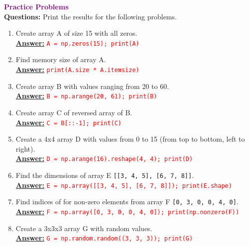 \documentclass{book}
\begin{document}
\newpage
\textbf{\textcolor{purple}{\Large{Practice Problems}}}\\
\textbf{Questions:} Print the results for the following problems.\\
\begin{enumerate}
    \item Create array A of size 15 with all zeros.\\
    \underline{\textbf{Answer:}} \textcolor{red}{\texttt{A = np.zeros(15); print(A)}}
    \vspace{1.5mm}
    \item Find memory size of array A.\\
    \underline{\textbf{Answer:}} \textcolor{red}{\texttt{print(A.size * A.itemsize)}}
    \vspace{1.5mm}
    \item Create array B with values ranging from 20 to 60.\\
    \underline{\textbf{Answer:}} \textcolor{red}{\texttt{B = np.arange(20, 61); print(B)}}
    \vspace{1.5mm}
    \item Create array C of reversed array of B.\\
    \underline{\textbf{Answer:}} \textcolor{red}{\texttt{C = B[::-1]; print(C)}}
    \vspace{1.5mm}
    \item Create a 4x4 array D with values from 0 to 15 (from top to bottom, left to right).\\
    \underline{\textbf{Answer:}} \textcolor{red}{\texttt{D = np.arange(16).reshape(4, 4); print(D)}}
    \vspace{1.5mm}
    \item Find the dimensions of array E \texttt{[[3, 4, 5], [6, 7, 8]]}.\\
    \underline{\textbf{Answer:}} \textcolor{red}{\texttt{E = np.array([[3, 4, 5], [6, 7, 8]]); print(E.shape)}}
    \vspace{1.5mm}
    \item Find indices of for non-zero elements from array F \texttt{[0, 3, 0, 0, 4, 0]}.\\
    \underline{\textbf{Answer:}} \textcolor{red}{\texttt{F = np.array([0, 3, 0, 0, 4, 0]); print(np.nonzero(F))}}
    \vspace{1.5mm}
    \item Create a 3x3x3 array G with random values.\\
    \underline{\textbf{Answer:}} \textcolor{red}{\texttt{G = np.random.random((3, 3, 3)); print(G)}}

\end{enumerate}
\end{document}
